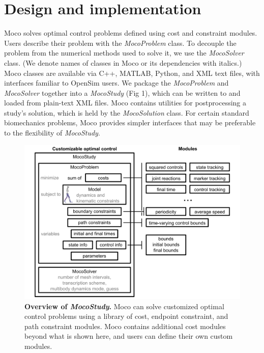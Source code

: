 \documentclass[10pt,letterpaper]{article}
\begin{document}
\section*{Design and implementation}

Moco solves optimal control problems defined using cost and constraint modules. Users describe their problem with the \textit{MocoProblem} class. To decouple the problem from the numerical methods used to solve it, we use the \textit{MocoSolver} class. (We denote names of classes in Moco or its dependencies with italics.) Moco classes are available via C++, MATLAB, Python, and XML text files, with interfaces familiar to OpenSim users. We package the \textit{MocoProblem} and \textit{MocoSolver} together into a \textit{MocoStudy} (Fig 1), which can be written to and loaded from plain-text XML files. Moco contains utilities for postprocessing a study’s solution, which is held by the \textit{MocoSolution} class. For certain standard biomechanics problems, Moco provides simpler interfaces that may be preferable to the flexibility of \textit{MocoStudy}.

\begin{figure}[!h]
\centering
    \includegraphics{../figures/MocoStudyDiagram.png}
    \caption{{\bf Overview of \textit{MocoStudy}.}
    Moco can solve customized optimal control problems using a library of cost, endpoint constraint, and path constraint modules. Moco contains additional cost modules beyond what is shown here, and users can define their own custom modules.}
    \label{mocodiagram}
\end{figure}
\end{document}
